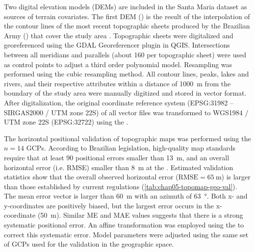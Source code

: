 Two digital elevation models (DEMs) are included in the Santa Maria dataset as sources of terrain covariates. 
The first DEM (\demNew) is the result of the interpolation of the contour lines of the most recent topographic 
sheets produced by the Brazilian Army () that cover the study area \cite{DSG1980, DSG1992, 
DSG1992a}. Topographic sheets were digitalized and georeferenced using the GDAL Georeferencer plugin in QGIS. 
Intersections between all meridians and parallels (about \num{160} per topographic sheet) were used as control 
points to adjust a third order polynomial model. Resampling was performed using the cubic resampling method. 
All contour lines, peaks, lakes and rivers, and their respective attributes within a distance of 
\SI{1000}{\metre} from the boundary of the study area were manually digitized and stored in vector format. 
After digitalization, the original coordinate reference system (EPSG:31982 -- SIRGAS2000 / UTM zone 22S) of all 
vector files was transformed to WGS1984 / UTM zone 22S (EPSG:32722) using the  
\cite{BivandEtAl2013a}.

The horizontal positional validation of topographic maps was performed using the $n = 14$ GCPs. According to 
Brazilian legislation, high-quality map standards require that at least 90%
positional errors smaller than \SI{13}{\metre}, and an overall horizontal error (i.e. RMSE) smaller than 
\SI{8}{\metre} at the  \cite{Brasil1984}. Estimated validation statistics show that the overall 
observed horizontal error ($\text{RMSE} = \SI{65}{\m}$) is larger than those established by current regulations 
(\autoref{tab:chap05-topomap-geo-val}). The mean error vector is larger than \SI{60}{\metre} with an azimuth of 
\SI{63}{\degree}. Both x- and y-coordinates are positively biased, but the largest error occurs in the 
x-coordinate (\SI{50}{\metre}). Similar ME and MAE values suggests that there is a strong systematic positional 
error. An affine transformation was employed using the  \cite{Carrillo2012} to correct 
this systematic error. Model parameters were adjusted using the same set of GCPs used for the validation in the 
geographic space.


